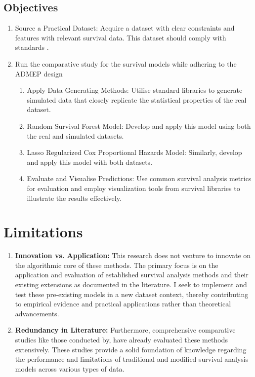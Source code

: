 \subsection{Objectives}
\begin{enumerate}
    \item Source a Practical Dataset: Acquire a dataset with clear constraints and features with relevant survival data. This dataset should comply with standards \parencite{wilkinson_fair_2016}. 
    \item Run the comparative study for the survival models while adhering to the ADMEP design \parencite{morris_using_2019}
    \begin{enumerate}
        \item Apply Data Generating Methods: Utilise standard libraries to generate simulated data that closely replicate the statistical properties of the real dataset.
        \item Random Survival Forest Model: Develop and apply this model using both the real and simulated datasets.
        \item Lasso Regularized Cox Proportional Hazards Model: Similarly, develop and apply this model with both datasets.
        \item Evaluate and Visualise Predictions: Use common survival analysis metrics for evaluation and employ visualization tools from survival libraries to illustrate the results effectively.
    \end{enumerate}
\end{enumerate}
 
\section{Limitations}
\begin{enumerate}
    \item \textbf{Innovation vs. Application:} This research does not venture to innovate on the algorithmic core of these methods. The primary focus is on the application and evaluation of established survival analysis methods and their existing extensions as documented in the literature. I seek to implement and test these pre-existing models in a new dataset context, thereby contributing to empirical evidence and practical applications rather than theoretical advancements.
    \item \textbf{Redundancy in Literature:} Furthermore, comprehensive comparative studies like those conducted by, \parencite{kurt_omurlu_comparisons_2009} \parencite{smith_scoping_2022} have already evaluated these methods extensively. These studies provide a solid foundation of knowledge regarding the performance and limitations of traditional and modified survival analysis models across various types of data.
\end{enumerate}

